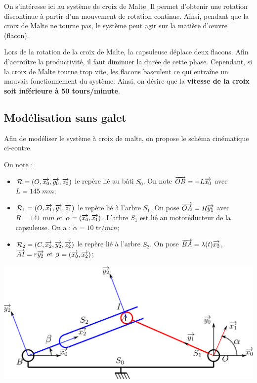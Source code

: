 \documentclass[10pt,oneside]{article}
\begin{document}
\vspace{.5cm}

On s'intéresse ici au système de croix de Malte. Il permet d'obtenir une rotation discontinue à partir d'un mouvement de rotation continue. Ainsi, pendant que la croix de Malte ne tourne pas, le système peut agir sur la matière d'\oe{}uvre (flacon).

Lors de la rotation de la croix de Malte, la capsuleuse déplace deux flacons. Afin d'accroître la productivité, il faut diminuer la durée de cette phase. Cependant, si la croix de Malte tourne trop vite, les flacons basculent ce qui entraîne un mauvais fonctionnement du système. Ainsi, on désire que la \textbf{vitesse de la croix soit inférieure à 50 tours/minute}. 



\subsection*{Modélisation sans galet}

\begin{minipage}[c]{.4\linewidth}
Afin de modéliser le système à croix de malte, on propose le schéma cinématique ci-contre. 


On note :
\begin{itemize}
\item $\mathcal{R}=\left( O,\overrightarrow{x_0},\overrightarrow{y_0},\overrightarrow{z_0}\right)$ le repère lié au bâti $S_0$. On note $\overrightarrow{OB}=-L\overrightarrow{x_0}$ avec $L = 145\; mm$;
\item $\mathcal{R}_1=\left( O,\overrightarrow{x_1},\overrightarrow{y_1},\overrightarrow{z_1}\right)$ le repère lié à l'arbre $S_1$. On pose $\overrightarrow{OA}=R\overrightarrow{y_1}$  avec $R =141\;mm$ et $\alpha = \left( \overrightarrow{x_0}, \overrightarrow{x_1}\right)$. L'arbre $S_1$ est lié au motoréducteur de la capsuleuse. On a : $\dot{\alpha} = 10\;tr/min$;
\item  $\mathcal{R}_2=\left( C,\overrightarrow{x_2},\overrightarrow{y_2},\overrightarrow{z_2}\right)$ le repère lié à l'arbre $S_2$. On pose $\overrightarrow{BA}=\lambda(t)\overrightarrow{x_2}$,  $\overrightarrow{AI}=r\overrightarrow{y_2}$ et $\beta = \left( \overrightarrow{x_0}, \overrightarrow{x_2}\right)$;
\end{itemize}


\end{minipage} \hfill
\begin{minipage}[c]{.55\linewidth}
\begin{center}
 \includegraphics[width=\textwidth]{png/schema1}
\end{center}
\end{minipage}
\end{document}
